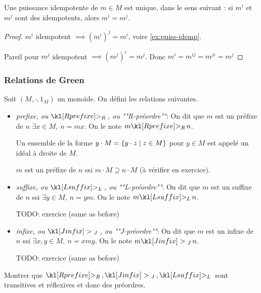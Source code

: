 \begin{lemma}\label{lem:puiss-idemp}
	Une puissance idempotente de $m \in M$ est unique, dans le sens suivant : si $m^i$ et $m^j$ sont des idempotents, alors $m^i = m^j$.
\end{lemma}

\begin{proof}
	$m^i$ idempotent $\implies (m^i)^j = m^i$, voire \ref{ex:puiss-idemp}.

	Pareil pour $m^j$ idempotent $\implies (m^j)^i = m^j$.
	Donc $m^i = m^{ij} = m^{ji} = m^{j}$
\end{proof}

\subsubsection{Relations de Green}

\begin{definition}
	Soit $(M,\cdot , 1_M)$ un monoïde. On défini les relations suivantes.

	\begin{itemize}
		\item \emph{prefixe, ou $\geqr$, ou ""R-préordre""}: On dit que $m$ est un préfixe de $n$ \ssi $\exists x \in M, \ n = mx$.
		      On le note $m \geqr n$.

		      Un ensemble de la forme $y \cdot M = \left\{y \cdot z \mid z \in M\right\}$ pour $y \in M$ est appelé un idéal à droite de $M$.

		      $m$ est un préfixe de $n$ ssi $m \cdot M \supseteq n \cdot M$ (à vérifier en exercice).


		\item \emph{suffixe, ou $\geql$, ou ""L-préordre""}: On dit que $m$ est un suffixe de $n$ ssi $\exists y \in M, \ n = ym$.
		      On le note $m \geql n$.

		      TODO: exercice (same as before)


		\item \emph{infixe, ou $\geqj$, ou ""J-préordre""}: On dit que $m$ est un infixe de $n$ ssi $\exists x,y \in M, \ n = xmy$.
		      On le note $m \geqj n$.

		      TODO: exercice (same as before)
	\end{itemize}
\end{definition}

\begin{exercice}
	Montrer que $\geqr,\geqj,\geql$  sont transitives et réflexives et donc des préordres.
\end{exercice}

